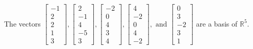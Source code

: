 \begin{exercise}
\begin{exerciseStatement}
  \end{exerciseStatement}
  \begin{exerciseAnswer}
   The vectors \(\left[\begin{array}{r}
-1 \\
2 \\
2 \\
1 \\
3
\end{array}\right] , \left[\begin{array}{r}
2 \\
-1 \\
4 \\
-5 \\
3
\end{array}\right] , \left[\begin{array}{r}
-2 \\
0 \\
4 \\
3 \\
4
\end{array}\right] , \left[\begin{array}{r}
4 \\
-2 \\
0 \\
4 \\
-2
\end{array}\right] , \text{ and } \left[\begin{array}{r}
0 \\
3 \\
-2 \\
3 \\
1
\end{array}\right]\) 
  	 are  a basis of \(\mathbb{R}^5\).
  


  \end{exerciseAnswer}
\end{exercise}